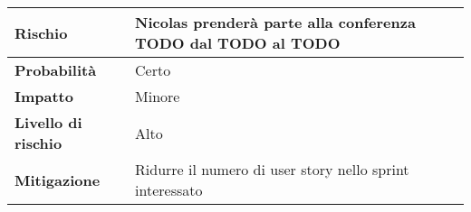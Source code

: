 \begin{table}[H]
  \begin{tabularx}{\textwidth}{lX}
    \toprule
    \textbf{Rischio}            & \textbf{Nicolas prenderà parte alla conferenza TODO dal TODO al TODO} \\
    \midrule
    \textbf{Probabilità}        & Certo                                                                 \\
    \textbf{Impatto}            & Minore                                                                \\
    \textbf{Livello di rischio} & Alto                                                                  \\
    \textbf{Mitigazione}        & Ridurre il numero di user story nello sprint interessato              \\
    \bottomrule
  \end{tabularx}
\end{table}

